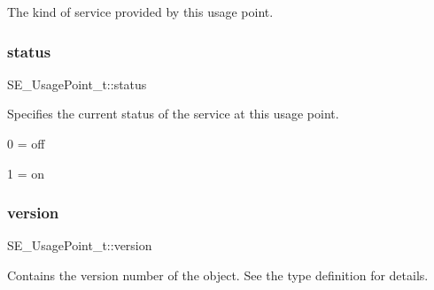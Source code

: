 The kind of service provided by this usage point. \mbox{\label{group__UsagePoint_gad92c2e2bb45df1e0967e40cfb59d1454}} 
\subsubsection{\texorpdfstring{status}{status}}
{\footnotesize\ttfamily S\+E\+\_\+\+Usage\+Point\+\_\+t\+::status}

Specifies the current status of the service at this usage point.

0 = off

1 = on \mbox{\label{group__UsagePoint_gaebce20c6df39c9a81d141f4ec08c5b50}} 
\subsubsection{\texorpdfstring{version}{version}}
{\footnotesize\ttfamily S\+E\+\_\+\+Usage\+Point\+\_\+t\+::version}

Contains the version number of the object. See the type definition for details. 